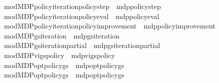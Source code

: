 \begin{isabellebody}
\ \ \ \ \ mod{\isacharunderscore}{\kern0pt}MDP{\isacharunderscore}{\kern0pt}policy{\isacharunderscore}{\kern0pt}iteration{\isacharunderscore}{\kern0pt}policy{\isacharunderscore}{\kern0pt}step{\isacharprime}{\kern0pt}\ {\isacharequal}{\kern0pt}\ mdp{\isachardot}{\kern0pt}policy{\isacharunderscore}{\kern0pt}step{\isacharprime}{\kern0pt}\isanewline
\ \ \ \ \ mod{\isacharunderscore}{\kern0pt}MDP{\isacharunderscore}{\kern0pt}policy{\isacharunderscore}{\kern0pt}iteration{\isacharunderscore}{\kern0pt}policy{\isacharunderscore}{\kern0pt}eval{\isacharprime}{\kern0pt}\ {\isacharequal}{\kern0pt}\ mdp{\isachardot}{\kern0pt}policy{\isacharunderscore}{\kern0pt}eval{\isacharprime}{\kern0pt}\isanewline
\ \ \ \ \ mod{\isacharunderscore}{\kern0pt}MDP{\isacharunderscore}{\kern0pt}policy{\isacharunderscore}{\kern0pt}iteration{\isacharunderscore}{\kern0pt}policy{\isacharunderscore}{\kern0pt}improvement{\isacharprime}{\kern0pt}\ {\isacharequal}{\kern0pt}\ mdp{\isachardot}{\kern0pt}policy{\isacharunderscore}{\kern0pt}improvement{\isacharprime}{\kern0pt}\isanewline
\ \ \ \ \ mod{\isacharunderscore}{\kern0pt}MDP{\isacharunderscore}{\kern0pt}gs{\isacharunderscore}{\kern0pt}iteration\ {\isacharequal}{\kern0pt}\ mdp{\isachardot}{\kern0pt}gs{\isacharunderscore}{\kern0pt}iteration\isanewline
\ \ \ \ \ mod{\isacharunderscore}{\kern0pt}MDP{\isacharunderscore}{\kern0pt}gs{\isacharunderscore}{\kern0pt}iteration{\isacharunderscore}{\kern0pt}partial\ {\isacharequal}{\kern0pt}\ mdp{\isachardot}{\kern0pt}gs{\isacharunderscore}{\kern0pt}iteration{\isacharunderscore}{\kern0pt}partial\isanewline
\ \ \ \ \ mod{\isacharunderscore}{\kern0pt}MDP{\isacharunderscore}{\kern0pt}vi{\isacharunderscore}{\kern0pt}gs{\isacharunderscore}{\kern0pt}policy\ {\isacharequal}{\kern0pt}\ mdp{\isachardot}{\kern0pt}vi{\isacharunderscore}{\kern0pt}gs{\isacharunderscore}{\kern0pt}policy\isanewline
\ \ \ \ \ mod{\isacharunderscore}{\kern0pt}MDP{\isacharunderscore}{\kern0pt}opt{\isacharunderscore}{\kern0pt}policy{\isacharunderscore}{\kern0pt}gs\ {\isacharequal}{\kern0pt}\ mdp{\isachardot}{\kern0pt}opt{\isacharunderscore}{\kern0pt}policy{\isacharunderscore}{\kern0pt}gs\isanewline
\ \ \ \ \ mod{\isacharunderscore}{\kern0pt}MDP{\isacharunderscore}{\kern0pt}opt{\isacharunderscore}{\kern0pt}policy{\isacharunderscore}{\kern0pt}gs{\isacharprime}{\kern0pt}{\isacharprime}{\kern0pt}\ {\isacharequal}{\kern0pt}\ mdp{\isachardot}{\kern0pt}opt{\isacharunderscore}{\kern0pt}policy{\isacharunderscore}{\kern0pt}gs{\isacharprime}{\kern0pt}{\isacharprime}{\kern0pt}\isanewline

\end{isabellebody}
